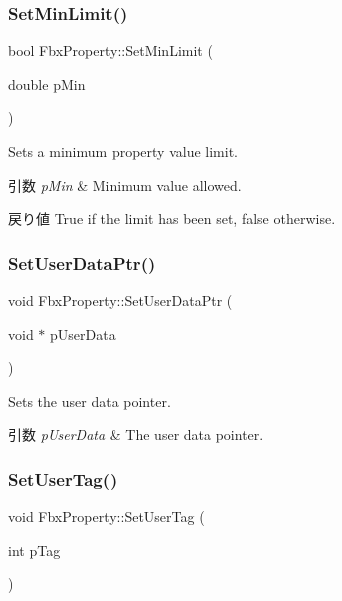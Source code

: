 \subsubsection{\texorpdfstring{Set\+Min\+Limit()}{SetMinLimit()}}
{\footnotesize\ttfamily bool Fbx\+Property\+::\+Set\+Min\+Limit (\begin{DoxyParamCaption}\item[{double}]{p\+Min }\end{DoxyParamCaption})}

Sets a minimum property value limit. 
\begin{DoxyParams}{引数}
{\em p\+Min} & Minimum value allowed. \\
\hline
\end{DoxyParams}
\begin{DoxyReturn}{戻り値}
{\ttfamily True} if the limit has been set, {\ttfamily false} otherwise. 
\end{DoxyReturn}
\mbox{\label{class_fbx_property_a36506608b92abf21707be1c06a6cac3b}} 
\subsubsection{\texorpdfstring{Set\+User\+Data\+Ptr()}{SetUserDataPtr()}}
{\footnotesize\ttfamily void Fbx\+Property\+::\+Set\+User\+Data\+Ptr (\begin{DoxyParamCaption}\item[{void $\ast$}]{p\+User\+Data }\end{DoxyParamCaption})}

Sets the user data pointer. 
\begin{DoxyParams}{引数}
{\em p\+User\+Data} & The user data pointer. \\
\hline
\end{DoxyParams}
\mbox{\label{class_fbx_property_affbc6e79fd35b52606d84d4e6839725c}} 
\subsubsection{\texorpdfstring{Set\+User\+Tag()}{SetUserTag()}}
{\footnotesize\ttfamily void Fbx\+Property\+::\+Set\+User\+Tag (\begin{DoxyParamCaption}\item[{int}]{p\+Tag }\end{DoxyParamCaption})}

